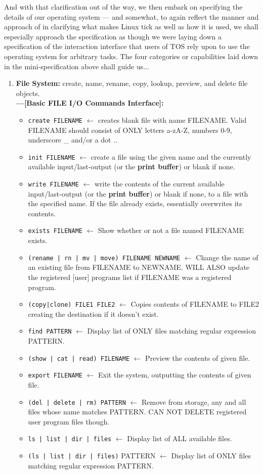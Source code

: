 \documentclass{article}
\begin{document}
And with that clarification out of the way, we then embark on specifying the details of our operating system --- and somewhat, to again reflect the manner and approach of \cite{Siever2000LinuxNutshell} in clarifying what makes Linux tick as well as how it is used, we shall especially approach the specification as though we were laying down a specification of the interaction interface that users of TOS rely upon to use the operating system for arbitrary tasks. The four categories or capabilities laid down in the mini-specification above shall guide us...


\vspace{2em}


\begin{enumerate}
\item {  \textbf{File System:} create, name, rename, copy, lookup, preview, and delete file objects.\\
\textbf{---[Basic FILE I/O Commands Interface]:}
\begin{itemize}
\item \texttt{create FILENAME} $\leftarrow$ creates blank file with name FILENAME. Valid FILENAME should consist of ONLY letters a-zA-Z, numbers 0-9, underscore \_ and/or a dot ..
\item \texttt{init FILENAME} $\leftarrow$ create a file using the given name and the currently available input/last-output (or the \textbf{print buffer}) or blank if none.
\item \texttt{write FILENAME} $\leftarrow$ write the contents of the current available input/last-output (or the \textbf{print buffer}) or blank if none, to a file with the specified name. If the file already exists, essentially overwrites its contents.
\item \texttt{exists FILENAME} $\leftarrow$ Show whether or not a file named FILENAME exists.
\item \texttt{(rename | rn | mv | move) FILENAME NEWNAME} $\leftarrow$ Change the name of an existing file from FILENAME to NEWNAME. WILL ALSO update the registered [user] programs list if FILENAME was a registered program.
\item \texttt{(copy|clone) FILE1 FILE2} $\leftarrow$ Copies contents of FILENAME to FILE2 creating the destination if it doesn't exist.
\item \texttt{find PATTERN} $\leftarrow$ Display list of ONLY files matching regular expression PATTERN.
\item \texttt{(show | cat | read) FILENAME} $\leftarrow$ Preview the contents of given file.
\item \texttt{export FILENAME} $\leftarrow$ Exit the system, outputting the contents of given file.
\item \texttt{(del | delete | rm) PATTERN} $\leftarrow$ Remove from storage, any and all files whose name matches PATTERN. CAN NOT DELETE registered user program files though.
\item \texttt{ls | list | dir | files} $\leftarrow$ Display list of ALL available files.
\item \texttt{(ls | list | dir | files)} PATTERN $\leftarrow$ Display list of ONLY files matching regular expression PATTERN.
\end{itemize}

}
\end{enumerate}
\end{document}
